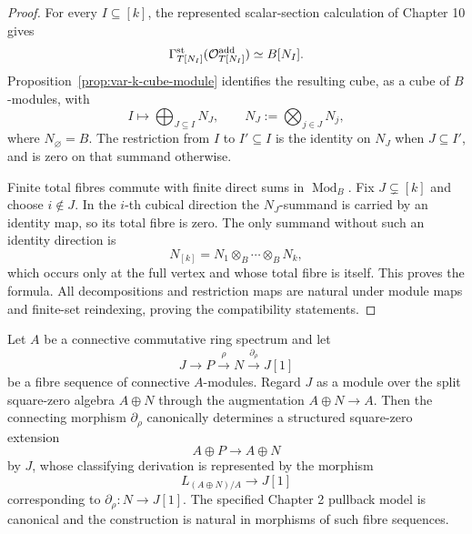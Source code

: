 \begin{proof}
For every \(I\subseteq[k]\), the represented scalar-section calculation of Chapter 10 gives
\[
    \Gamma_{T[N_I]}^{\mathrm{st}}(\mathcal O^{\mathrm{add}}_{T[N_I]})
    \simeq
    B[N_I].
\]
Proposition~\ref{prop:var-k-cube-module} identifies the resulting cube, as a cube of \(B\)-modules, with
\[
    I
    \longmapsto
    \bigoplus_{J\subseteq I}N_J,
    \qquad
    N_J:=\bigotimes_{j\in J}N_j,
\]
where \(N_\varnothing=B\).  The restriction from \(I\) to \(I'\subseteq I\) is the identity on \(N_J\) when \(J\subseteq I'\), and is zero on that summand otherwise.

Finite total fibres commute with finite direct sums in \(\operatorname{Mod}_B\).  Fix \(J\subsetneq[k]\) and choose \(i\notin J\).  In the \(i\)-th cubical direction the \(N_J\)-summand is carried by an identity map, so its total fibre is zero.  The only summand without such an identity direction is
\[
    N_{[k]}=N_1\otimes_B\cdots\otimes_BN_k,
\]
which occurs only at the full vertex and whose total fibre is itself.  This proves the formula.  All decompositions and restriction maps are natural under module maps and finite-set reindexing, proving the compatibility statements.
\end{proof}

\begin{lemma}
\label{lem:var-connecting-structured-extension}
Let \(A\) be a connective commutative ring spectrum and let
\[
    J\longrightarrow P\xrightarrow{\rho}N
    \xrightarrow{\partial_\rho}J[1]
\]
be a fibre sequence of connective \(A\)-modules.  Regard \(J\) as a module over the split square-zero algebra \(A\oplus N\) through the augmentation \(A\oplus N\to A\).  Then the connecting morphism \(\partial_\rho\) canonically determines a structured square-zero extension
\[
    \boxed{
    A\oplus P
    \longrightarrow
    A\oplus N
    }
\]
by \(J\), whose classifying derivation is represented by the morphism
\[
    L_{(A\oplus N)/A}
    \longrightarrow
    J[1]
\]
corresponding to \(\partial_\rho:N\to J[1]\).  The specified Chapter 2 pullback model is canonical and the construction is natural in morphisms of such fibre sequences.
\end{lemma}


